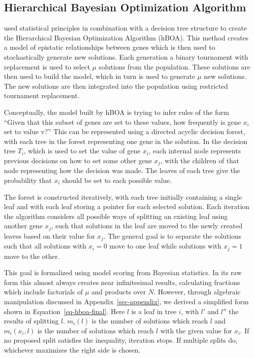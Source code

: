 \documentclass[twoside]{article}
\begin{document}
\subsection{Hierarchical Bayesian Optimization Algorithm}

\cite{pelikan:2006:hboa} used statistical principles in combination with a decision tree structure
to create the Hierarchical Bayesian Optimization Algorithm (hBOA). This method creates a model of
epistatic relationships between genes which is then used to stochastically generate new solutions.
Each generation a binary tournament with replacement is used to select $\mu$ solutions from
the population. These solutions are then used to build the model, which in turn is used to generate $\mu$ new
solutions. The new solutions are then integrated into the population using restricted tournament
replacement.

Conceptually, the model built by hBOA is trying to infer rules of the form ``Given that this
subset of genes are set to these values, how frequently is gene $x_i$ set to value v?'' This can
be represented using a directed acyclic decision forest, with each tree in the forest representing one gene
in the solution. In the decision tree $T_i$, which is used to set the value of gene $x_i$,
each internal node represents previous decisions on how to set
some other gene $x_j$, with the children of that node representing how the decision was made. The
leaves of each tree give the probability that $x_i$ should be set to each possible value.

The forest is constructed iteratively, with each tree initially containing a single leaf
and with each leaf storing a pointer for each selected solution. Each iteration the algorithm considers
all possible ways of splitting an existing leaf using another gene $x_j$, such that solutions in the
leaf are moved to the newly created leaves based on their value for $x_j$. The general goal is to
separate the solutions such that all solutions with $x_i = 0$ move to one leaf while solutions with
$x_j = 1$ move to the other.

This goal is formalized using model scoring from Bayesian statistics. In its raw form this
almost always creates near infinitesimal results, calculating fractions which include factorials of $\mu$
and products over $N$. However, through algebraic manipulation discussed in Appendix~\ref{sec-appendix}, we
derived a simplified form shown in Equation~\ref{eq-hboa-final}.
Here $l$ is a leaf in tree $i$, with $l'$ and $l''$ the results of splitting $l$. $m_i(l)$ is the number
of solutions which reach $l$ and $m_i(x_i, l)$ is the number of solutions which reach $l$ with the given value
for $x_i$.
If no proposed split satisfies the inequality, iteration stops.
If multiple splits do, whichever maximizes the right side is chosen.
\end{document}
